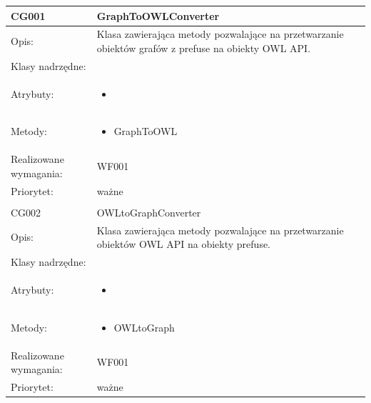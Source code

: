 \documentclass[a4paper,10pt]{article}
\begin{document}
\begin{center}
 


\begin{longtable}{|m{3cm}|m{9cm}|} \hline

CG001 & GraphToOWLConverter \\ \hline
Opis: & Klasa zawierająca metody pozwalające na przetwarzanie obiektów grafów z prefuse na obiekty OWL API. \\ \hline
Klasy nadrzędne: &     \\ \hline
Atrybuty: & \begin{itemize}
 \item 
\end{itemize}
 \\ \hline
Metody: & \begin{itemize}
 \item GraphToOWL
\end{itemize}
  \\ \hline
Realizowane wymagania: & WF001 \\ \hline
Priorytet: & ważne  \\ \hline

\multicolumn{2}{c}{} \\
 \hline

CG002 & OWLtoGraphConverter \\ \hline
Opis: & Klasa zawierająca metody pozwalające na przetwarzanie obiektów OWL API na obiekty prefuse. \\ \hline
Klasy nadrzędne: &     \\ \hline
Atrybuty: & \begin{itemize}
 \item 
\end{itemize}
 \\ \hline
Metody: & \begin{itemize}
 \item OWLtoGraph
\end{itemize}
  \\ \hline
Realizowane wymagania: & WF001 \\ \hline
Priorytet: & ważne  \\ \hline



\end{longtable}

\end{center}


\clearpage
{}
{}

\end{document}

